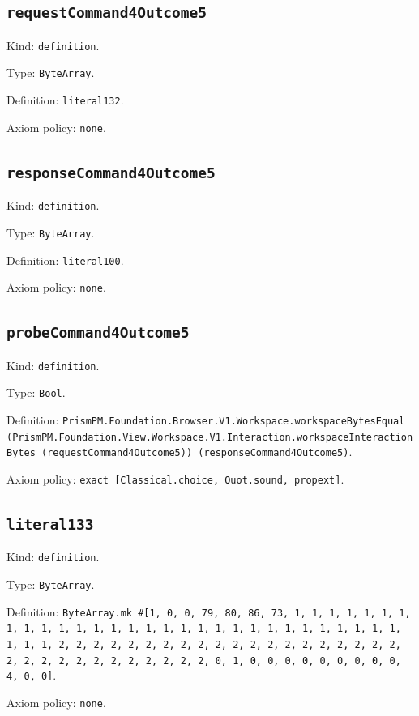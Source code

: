 \documentclass[11pt]{article}
\begin{document}
\subsection*{\texttt{requestCommand4Outcome5}}
\noindent Kind: \texttt{definition}.\par
\noindent Type: \texttt{ByteArray}.\par
\noindent Definition: \texttt{literal132}.\par
\noindent Axiom policy: \texttt{none}.\par
\subsection*{\texttt{responseCommand4Outcome5}}
\noindent Kind: \texttt{definition}.\par
\noindent Type: \texttt{ByteArray}.\par
\noindent Definition: \texttt{literal100}.\par
\noindent Axiom policy: \texttt{none}.\par
\subsection*{\texttt{probeCommand4Outcome5}}
\noindent Kind: \texttt{definition}.\par
\noindent Type: \texttt{Bool}.\par
\noindent Definition: \texttt{PrismPM.Foundation.Browser.V1.Workspace.workspaceBytesEqual (PrismPM.Foundation.View.Workspace.V1.Interaction.workspaceInteractionBytes (requestCommand4Outcome5)) (responseCommand4Outcome5)}.\par
\noindent Axiom policy: \texttt{exact [Classical.choice, Quot.sound, propext]}.\par
\subsection*{\texttt{literal133}}
\noindent Kind: \texttt{definition}.\par
\noindent Type: \texttt{ByteArray}.\par
\noindent Definition: \texttt{ByteArray.mk \#[1, 0, 0, 79, 80, 86, 73, 1, 1, 1, 1, 1, 1, 1, 1, 1, 1, 1, 1, 1, 1, 1, 1, 1, 1, 1, 1, 1, 1, 1, 1, 1, 1, 1, 1, 1, 1, 1, 1, 1, 2, 2, 2, 2, 2, 2, 2, 2, 2, 2, 2, 2, 2, 2, 2, 2, 2, 2, 2, 2, 2, 2, 2, 2, 2, 2, 2, 2, 2, 2, 2, 2, 0, 1, 0, 0, 0, 0, 0, 0, 0, 0, 0, 4, 0, 0]}.\par
\noindent Axiom policy: \texttt{none}.\par
\end{document}
